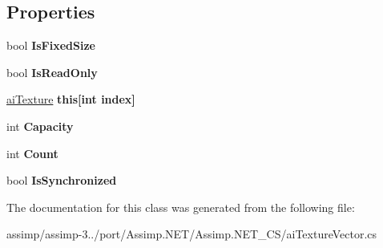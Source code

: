 \subsection*{Properties}
\begin{DoxyCompactItemize}
\item 
\hypertarget{classai_texture_vector_a747c30a0ea5e503489c6535d4f154f72}{bool {\bfseries Is\+Fixed\+Size}}\label{classai_texture_vector_a747c30a0ea5e503489c6535d4f154f72}

\item 
\hypertarget{classai_texture_vector_a8d7f039819b8d0ba75f91c9909367fdc}{bool {\bfseries Is\+Read\+Only}}\label{classai_texture_vector_a8d7f039819b8d0ba75f91c9909367fdc}

\item 
\hypertarget{classai_texture_vector_a4d6bbd03a21c2af8ee59f10795b4a26b}{\hyperlink{structai_texture}{ai\+Texture} {\bfseries this\mbox{[}int index\mbox{]}}}\label{classai_texture_vector_a4d6bbd03a21c2af8ee59f10795b4a26b}

\item 
\hypertarget{classai_texture_vector_ae178829035d9921fd8b951a886982075}{int {\bfseries Capacity}}\label{classai_texture_vector_ae178829035d9921fd8b951a886982075}

\item 
\hypertarget{classai_texture_vector_a51f425baa54dfa1f63e05cb1fe6aa809}{int {\bfseries Count}}\label{classai_texture_vector_a51f425baa54dfa1f63e05cb1fe6aa809}

\item 
\hypertarget{classai_texture_vector_a66a1067ef6a19c0e170e5345430d996d}{bool {\bfseries Is\+Synchronized}}\label{classai_texture_vector_a66a1067ef6a19c0e170e5345430d996d}

\end{DoxyCompactItemize}


The documentation for this class was generated from the following file\+:\begin{DoxyCompactItemize}
\item 
assimp/assimp-\/3../port/\+Assimp.\+N\+E\+T/\+Assimp.\+N\+E\+T\+\_\+\+C\+S/ai\+Texture\+Vector.\+cs\end{DoxyCompactItemize}
